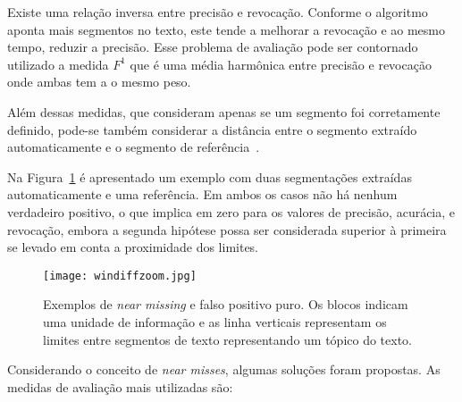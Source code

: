 Existe uma relação inversa entre precisão e revocação. Conforme o algoritmo aponta mais segmentos no texto, este tende a melhorar a revocação e ao mesmo tempo, reduzir a precisão. 
%
Esse problema de avaliação pode ser contornado utilizado a medida $F^1$ que é uma média harmônica entre precisão e revocação onde ambas tem a o mesmo peso. 

Além dessas medidas, que consideram apenas se um segmento foi corretamente definido, pode-se também considerar a distância entre o segmento extraído automaticamente e o segmento de referência~\cite{Kern2009}.


Na Figura~\ref{fig:exemplosegmentacaozoom} é apresentado um exemplo com duas segmentações extraídas automaticamente e uma referência. Em ambos os casos não há nenhum verdadeiro positivo, o que implica em zero para os valores de precisão, acurácia, e revocação, embora a segunda hipótese possa ser considerada superior à primeira se levado em conta a proximidade dos limites.



  \begin{figure}[!h]

	\centering
	\texttt{[image: windiffzoom.jpg]}
	\caption{Exemplos de \textit{near missing} e falso positivo puro. Os blocos indicam uma unidade de informação e as linha verticais representam os limites entre segmentos de texto representando um tópico do texto. }
	\label{fig:exemplosegmentacaozoom}

  \end{figure}
  

Considerando o conceito de \textit{near misses}, algumas soluções foram propostas. As medidas de avaliação mais utilizadas são:

